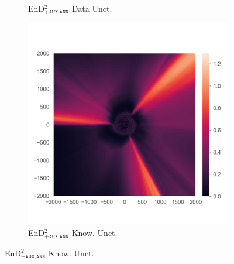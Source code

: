\begin{figure}
\begin{subfigure}{0.22\textwidth}
  \caption{EnD$^2_{\texttt{+AUX,ANN}}$ Data Unct.}
  \label{fig:3h}
\end{subfigure}%
\begin{subfigure}{0.22\textwidth}
  \centering
  \includegraphics[trim=42 45 15 55, clip, width=\linewidth]{plots/3l.png}
  \caption{EnD$^2_{\texttt{+AUX,ANN}}$ Know. Unct.}
  \label{fig:3i}
\end{subfigure}%


\end{figure}
